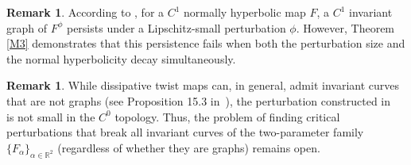 \documentclass{amsart}
\newcommand{\al}{\alpha}
\theoremstyle{definition}
\newtheorem{Remark}[Definition]{Remark}
\begin{document}

\begin{Remark}
According to \cite[Page 52, Remark 2]{HPS}, for a $C^1$ normally hyperbolic map $F$, a $C^1$ invariant graph of $F^\phi$ persists under a Lipschitz-small perturbation $\phi$. However, Theorem \ref{M3} demonstrates that this persistence fails when both the perturbation size and the normal hyperbolicity decay simultaneously.
\end{Remark}

\begin{Remark}
While dissipative twist maps can, in general, admit invariant curves that are not graphs (see Proposition 15.3 in~\cite{L2}), the perturbation constructed in~\cite{L2} is not small in the $C^0$ topology. Thus, the problem of finding critical perturbations that break all invariant curves of the two-parameter family $\{F_{\al}\}_{\alpha\in\mathbb{R}^2}$ (regardless of whether they are graphs) remains open.
\end{Remark}
\end{document}
